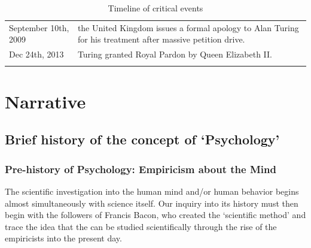\begin{longtable}[!t]{ | p{2cm} | p{11.8cm} | }
September 10th, 2009&the United Kingdom issues a formal apology to Alan Turing for his treatment after massive petition drive. \\
Dec 24th, 2013&Turing granted Royal Pardon by Queen Elizabeth II. \\ \hline

\caption{Timeline of critical events}
\label{table: timeline}
\end{longtable}


\section{Narrative}
\label{narrative}

\subsection{Brief history of the concept of `Psychology'}
\label{briefhistoryoftheconceptofpsychology}

\subsubsection{Pre-history of Psychology: Empiricism about the Mind}
\label{pre-historyofpsychology:empiricismaboutthemind}

The scientific investigation into the human mind and\slash or human behavior begins almost simultaneously with science itself. Our inquiry into its history must then begin with the followers of Francis Bacon, who created the ‘scientific method’ and trace the idea that the can be studied scientifically through the rise of the empiricists into the present day.


